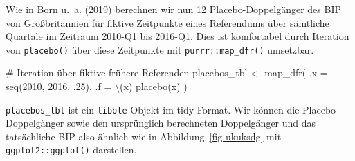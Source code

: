 \documentclass[
  a4paper,
  DIV=11,
  oneside]{scrreprt}
\newenvironment{Shaded}{\begin{snugshade}}{\end{snugshade}}
\newcommand{\AttributeTok}[1]{\textcolor[rgb]{0.40,0.45,0.13}{#1}}
\newcommand{\CommentTok}[1]{\textcolor[rgb]{0.37,0.37,0.37}{#1}}
\newcommand{\DecValTok}[1]{\textcolor[rgb]{0.68,0.00,0.00}{#1}}
\newcommand{\FunctionTok}[1]{\textcolor[rgb]{0.28,0.35,0.67}{#1}}
\newcommand{\NormalTok}[1]{\textcolor[rgb]{0.00,0.23,0.31}{#1}}
\newcommand{\OtherTok}[1]{\textcolor[rgb]{0.00,0.23,0.31}{#1}}
\newcommand{\SpecialCharTok}[1]{\textcolor[rgb]{0.37,0.37,0.37}{#1}}
\newcommand{\StringTok}[1]{\textcolor[rgb]{0.13,0.47,0.30}{#1}}
\begin{document}
\begin{Shaded}
\end{Shaded}

Wie in Born u.~a. (2019) berechnen wir nun 12 Placebo-Doppelgänger des
BIP von Großbritannien für fiktive Zeitpunkte eines Referendums über
sämtliche Quartale im Zeitraum 2010-Q1 bis 2016-Q1. Dies ist komfortabel
durch Iteration von \texttt{placebo()} über diese Zeitpunkte mit
\texttt{purrr::map\_dfr()} umsetzbar.

\begin{Shaded}
\begin{Highlighting}[]
\CommentTok{\# Iteration über fiktive frühere Referenden}
\NormalTok{placebos\_tbl }\OtherTok{\textless{}{-}} \FunctionTok{map\_dfr}\NormalTok{(}
  \AttributeTok{.x =} \FunctionTok{seq}\NormalTok{(}\DecValTok{2010}\NormalTok{, }\DecValTok{2016}\NormalTok{, .}\DecValTok{25}\NormalTok{), }
  \AttributeTok{.f =}\NormalTok{  \textbackslash{}(x) }\FunctionTok{placebo}\NormalTok{(x) }
\NormalTok{)}
\end{Highlighting}
\end{Shaded}

\texttt{placebos\_tbl} ist ein \texttt{tibble}-Objekt im tidy-Format.
Wir können die Placebo-Doppelgänger sowie den ursprünglich berechneten
Doppelgänger und das tatsächliche BIP also ähnlich wie in
Abbildung~\ref{fig-ukuksdg} mit \texttt{ggplot2::ggplot()} darstellen.
\end{document}

